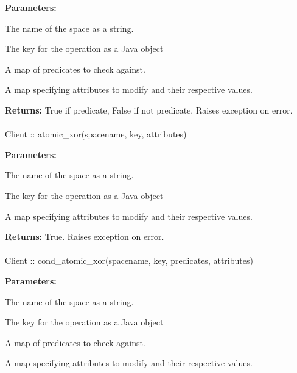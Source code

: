 \noindent\textbf{Parameters:}
\begin{description}[labelindent=\widthof{{\code{predicates}}},leftmargin=*,noitemsep,nolistsep,align=right]
\item[\code{spacename}] The name of the space as a string.
\item[\code{key}] The key for the operation as a Java object
\item[\code{predicates}] A map of predicates to check against.
\item[\code{attributes}] A map specifying attributes to modify and their respective values.
\end{description}

\noindent\textbf{Returns:}
True if predicate, False if not predicate.  Raises exception on error.

\paragraph{}
\label{api:java:atomic_xor}
\begin{javacode}
Client :: atomic_xor(spacename, key, attributes)
\end{javacode}
\funcdesc 

\noindent\textbf{Parameters:}
\begin{description}[labelindent=\widthof{{\code{attributes}}},leftmargin=*,noitemsep,nolistsep,align=right]
\item[\code{spacename}] The name of the space as a string.
\item[\code{key}] The key for the operation as a Java object
\item[\code{attributes}] A map specifying attributes to modify and their respective values.
\end{description}

\noindent\textbf{Returns:}
True.  Raises exception on error.

\paragraph{}
\label{api:java:cond_atomic_xor}
\begin{javacode}
Client :: cond_atomic_xor(spacename, key, predicates, attributes)
\end{javacode}
\funcdesc 

\noindent\textbf{Parameters:}
\begin{description}[labelindent=\widthof{{\code{predicates}}},leftmargin=*,noitemsep,nolistsep,align=right]
\item[\code{spacename}] The name of the space as a string.
\item[\code{key}] The key for the operation as a Java object
\item[\code{predicates}] A map of predicates to check against.
\item[\code{attributes}] A map specifying attributes to modify and their respective values.
\end{description}

